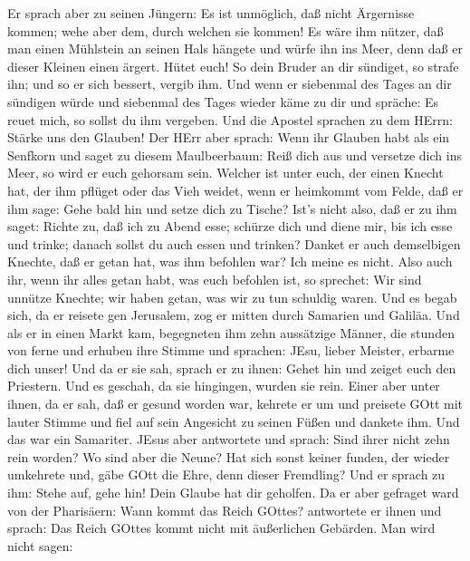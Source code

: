  Er sprach aber zu seinen Jüngern: Es ist unmöglich, daß
nicht Ärgernisse kommen; wehe aber dem, durch welchen sie kommen!
 Es wäre ihm nützer, daß man einen Mühlstein an seinen Hals
hängete und würfe ihn ins Meer, denn daß er dieser Kleinen einen ärgert.
 Hütet euch! So dein Bruder an dir sündiget, so strafe ihn;
und so er sich bessert, vergib ihm.  Und wenn er siebenmal
des Tages an dir sündigen würde und siebenmal des Tages wieder käme zu
dir und spräche: Es reuet mich, so sollst du ihm vergeben. 
Und die Apostel sprachen zu dem HErrn: Stärke uns den Glauben!
 Der HErr aber sprach: Wenn ihr Glauben habt als ein
Senfkorn und saget zu diesem Maulbeerbaum: Reiß dich aus und versetze
dich ins Meer, so wird er euch gehorsam sein.  Welcher ist
unter euch, der einen Knecht hat, der ihm pflüget oder das Vieh weidet,
wenn er heimkommt vom Felde, daß er ihm sage: Gehe bald hin und setze
dich zu Tische?  Ist's nicht also, daß er zu ihm saget:
Richte zu, daß ich zu Abend esse; schürze dich und diene mir, bis ich
esse und trinke; danach sollst du auch essen und trinken? 
Danket er auch demselbigen Knechte, daß er getan hat, was ihm befohlen
war? Ich meine es nicht.  Also auch ihr, wenn ihr alles
getan habt, was euch befohlen ist, so sprechet: Wir sind unnütze
Knechte; wir haben getan, was wir zu tun schuldig waren. 
Und es begab sich, da er reisete gen Jerusalem, zog er mitten durch
Samarien und Galiläa.  Und als er in einen Markt kam,
begegneten ihm zehn aussätzige Männer, die stunden von ferne
 und erhuben ihre Stimme und sprachen: JEsu, lieber
Meister, erbarme dich unser!  Und da er sie sah, sprach er
zu ihnen: Gehet hin und zeiget euch den Priestern. Und es geschah, da
sie hingingen, wurden sie rein.  Einer aber unter ihnen, da
er sah, daß er gesund worden war, kehrete er um und preisete GOtt mit
lauter Stimme  und fiel auf sein Angesicht zu seinen Füßen
und dankete ihm. Und das war ein Samariter.  JEsus aber
antwortete und sprach: Sind ihrer nicht zehn rein worden? Wo sind aber
die Neune?  Hat sich sonst keiner funden, der wieder
umkehrete und, gäbe GOtt die Ehre, denn dieser Fremdling? 
Und er sprach zu ihm: Stehe auf, gehe hin! Dein Glaube hat dir geholfen.
 Da er aber gefraget ward von der Pharisäern: Wann kommt
das Reich GOttes? antwortete er ihnen und sprach: Das Reich GOttes kommt
nicht mit äußerlichen Gebärden.  Man wird nicht sagen:
